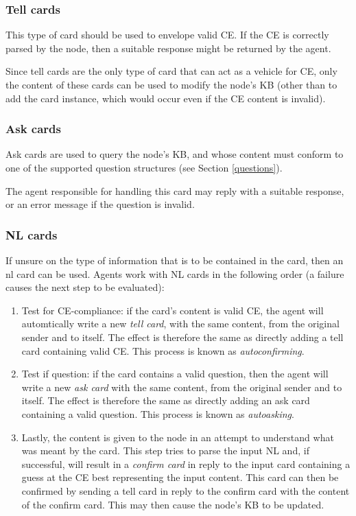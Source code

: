 \documentclass{scrartcl}
\begin{document}
\subsubsection{Tell cards}

This type of card should be used to envelope valid CE. If the CE is correctly parsed by the node, then a suitable response might be returned by the agent. 

Since tell cards are the only type of card that can act as a vehicle for CE, only the content of these cards can be used to modify the node's KB (other than to add the card instance, which would occur even if the CE content is invalid).

\subsubsection{Ask cards}

Ask cards are used to query the node's KB, and whose content must conform to one of the supported question structures (see Section \ref{questions}).

The agent responsible for handling this card may reply with a suitable response, or an error message if the question is invalid.

\subsubsection{NL cards}

If unsure on the type of information that is to be contained in the card, then an nl card can be used. Agents work with NL cards in the following order (a failure causes the next step to be evaluated):

\begin{enumerate}
  \item Test for CE-compliance: if the card's content is valid CE, the agent will automtically write a new \emph{tell card}, with the same content, from the original sender and to itself. The effect is therefore the same as directly adding a tell card containing valid CE. This process is known as \emph{autoconfirming}.
  \item Test if question: if the card contains a valid question, then the agent will write a new \emph{ask card} with the same content, from the original sender and to itself. The effect is therefore the same as directly adding an ask card containing a valid question. This process is known as \emph{autoasking}.
  \item Lastly, the content is given to the node in an attempt to understand what was meant by the card. This step tries to parse the input NL and, if successful, will result in a \emph{confirm card} in reply to the input card containing a guess at the CE best representing the input content. This card can then be confirmed by sending a tell card in reply to the confirm card with the content of the confirm card. This may then cause the node's KB to be updated.
\end{enumerate}
  
\end{document}
